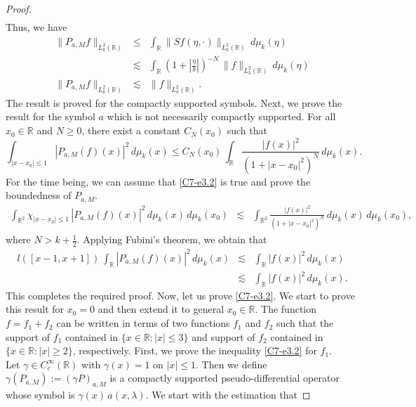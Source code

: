 \documentclass[10pt,a4paper]{amsart}
\begin{document}
\begin{proof}
\begin{eqnarray*}
 \end{eqnarray*}
 Thus, we have
 \begin{eqnarray*}
 \|P_{a,M}f\|_{L_k^2(\mathbb{R})} &\le& \int_{\mathbb{R}}\|Sf(\eta,\cdot)\|_{L_k^2(\mathbb{R})}\,d\mu_k(\eta)\\
 &\lesssim& \int_{\mathbb{R}}\left(1+ \left|\frac{\eta}{b} \right|\right)^{-N}\,\|f\|_{L_k^2(\mathbb{R})}\,d\mu_k(\eta)\\
\|P_{a,M}f\|_{L_k^2(\mathbb{R})} &\lesssim&  \|f\|_{L_k^2(\mathbb{R})}.
 \end{eqnarray*}
 The result is proved for the compactly supported symbols. Next, we prove the result for the symbol $a$ which is not necessarily compactly supported.  For all $x_0 \in \mathbb{R}$ and $ N\ge0$,  there exist a constant $C_N(x_0
 )$ such that
 \begin{equation}\label{C7-e3.2}
\int_{|x-x_0| \le 1} |P_{a,M}(f)(x)|^2\,d\mu_k(x) \le  C_N(x_0
 )\, \int_{\mathbb{R}}\frac{|f(x)|^2}{(1+|x-x_0|^2)^N}\,d\mu_k(x).  
 \end{equation}
For the time being, we can assume that \eqref{C7-e3.2} is true and prove the boundedness of $P_{a,M}$.
\begin{eqnarray*}
    \int_{\mathbb{R}^2} \chi_{|x-x_0|\le 1}\, |P_{a,M}(f)(x)|^2\,d\mu_k(x)\,d\mu_k(x_0) &\lesssim& \int_{\mathbb{R}^2}  \frac{|f(x)|^2}{(1+|x-x_0|^2)^N}\,d\mu_k(x)\,d\mu_k(x_0), \end{eqnarray*}
    where $N >k+\frac{1}{2}$. Applying Fubini's theorem, we obtain that
\begin{eqnarray*}
l(\left[x-1,x+1\right])\,\int_{\mathbb{R}} |P_{a,M}(f)(x)|^2\,d\mu_k(x) &\lesssim& \int_{\mathbb{R}} |f(x)|^2\, d\mu_k(x)\\
&\lesssim& \int_{\mathbb{R}} |f(x)|^2\, d\mu_k(x).
\end{eqnarray*}
This completes the required proof. Now, let us 
  prove \eqref{C7-e3.2}. We start to prove this result for $x_0=0$ and then extend it to general $x_0\in \mathbb{R}$. The function $f=f_1+f_2$ can be written in terms of two functions $f_1$ and $f_2$ such that the support of $f_1$ contained in $\{x \in \mathbb{R}: |x|\le 3\}$ and support of $f_2$ contained in $\{x \in \mathbb{R}: |x|\ge 2\}$, respectively.  First, we prove the inequality  \eqref{C7-e3.2} for $f_1$.\\
Let $\gamma \in C_c^\infty(\mathbb{R})$ with $\gamma(x)=1$ on $|x|\le 1$. Then we define $\gamma(P_{a,M}) := (\gamma P)_{a,M}$ is a compactly supported pseudo-differential operator whose symbol is $\gamma(x)\,a(x,\lambda)$. We start with the estimation that

\end{proof}
\end{document}
